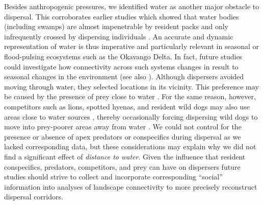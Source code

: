 \documentclass[abstract=on,10pt,a4paper,bibliography=totocnumbered]{article}
\begin{document}
Besides anthropogenic pressures, we identified water as another major obstacle
to dispersal. This corroborates earlier studies which showed that water bodies
(including swamps) are almost impenetrable by resident packs
\citep{Abrahms.2017} and only infrequently crossed by dispersing individuals
\citep{Cozzi.2020}. An accurate and dynamic representation of water is thus
imperative and particularly relevant in seasonal or flood-pulsing ecosystems
such as the Okavango Delta. In fact, future studies could investigate how
connectivity across such systems changes in result to seasonal changes in the
environment (see also \cite{Osipova.2019}). Although dispersers avoided moving
through water, they selected locations in its vicinity. This preference may be
caused by the presence of prey close to water \citep{Western.1975,
Bonyongo.2005}. For the same reason, however, competitors such as lions, spotted
hyenas, and resident wild dogs may also use areas close to water sources
\citep{Valeix.2010}, thereby occasionally forcing dispersing wild dogs to move
into prey-poorer areas away from water \citep{Ndaimani.2016}. We could not
control for the presence or absence of apex predators or conspecifics during
dispersal as we lacked corresponding data, but these considerations may explain
why we did not find a significant effect of \textit{distance to water}. Given
the influence that resident conspecifics, predators, competitors, and prey can
have on dispersers \citep{Cozzi.2018, Armansin.2019} future studies should
strive to collect and incorporate corresponding ``social'' information into
analyses of landscape connectivity to more precisely reconstruct dispersal
corridors.
\end{document}

